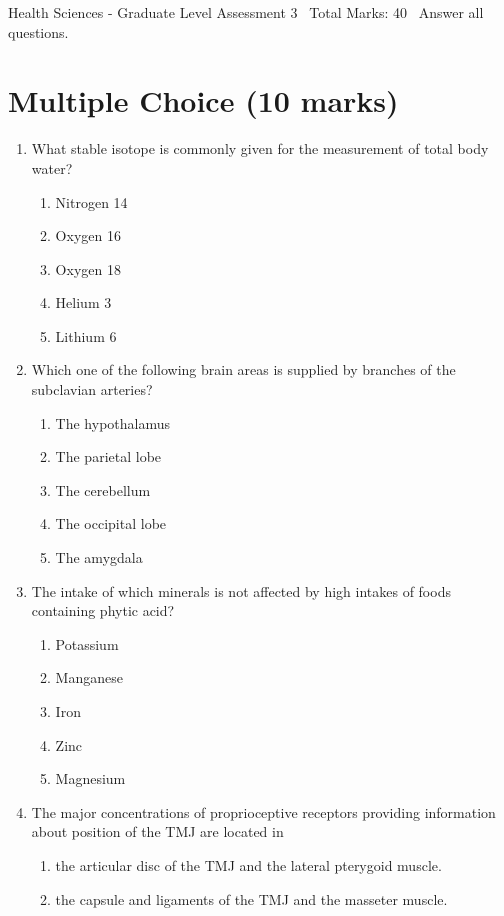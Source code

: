 \documentclass[12pt]{article}
\begin{document}
\begin{center}
Health Sciences - Graduate Level Assessment 3 \
Total Marks: 40 \
Answer all questions.
\end{center}

\section*{Multiple Choice (10 marks)}
\begin{enumerate}[label=\arabic*.]
\item What stable isotope is commonly given for the measurement of total body water?
\begin{enumerate}[label=(\alph*)]
    \item Nitrogen 14
    \item Oxygen 16
    \item Oxygen 18
    \item Helium 3
    \item Lithium 6
\end{enumerate}
\item Which one of the following brain areas is supplied by branches of the subclavian arteries?
\begin{enumerate}[label=(\alph*)]
    \item The hypothalamus
    \item The parietal lobe
    \item The cerebellum
    \item The occipital lobe
    \item The amygdala
\end{enumerate}
\item The intake of which minerals is not affected by high intakes of foods containing phytic acid?
\begin{enumerate}[label=(\alph*)]
    \item Potassium
    \item Manganese
    \item Iron
    \item Zinc
    \item Magnesium
\end{enumerate}
\item The major concentrations of proprioceptive receptors providing information about position of the TMJ are located in
\begin{enumerate}[label=(\alph*)]
    \item the articular disc of the TMJ and the lateral pterygoid muscle.
    \item the capsule and ligaments of the TMJ and the masseter muscle.

\end{enumerate}
\end{enumerate}
\end{document}
